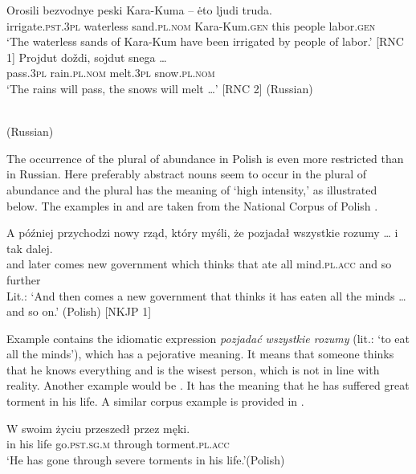 \documentclass[output=paper,colorlinks,citecolor=brown]{langscibook}
\begin{document}
\ea\label{ex:geist:42}
\ea\gll Orosili bezvodnye peski Kara-Kuma {--} ėto ljudi truda. \\
irrigate.\textsc{pst.3pl} waterless sand.\textsc{pl.nom} Kara-Kum.\textsc{gen} {} this people labor.\textsc{gen} \\
\glt `The waterless sands of Kara-Kum have been irrigated by people of labor.' \hfill [RNC 1]
\label{ex:geist:42a}
\ex\gll Projdut doždi, sojdut snega \ldots \\
pass.\textsc{3pl} rain.\textsc{pl.nom} melt.\textsc{3pl} snow.\textsc{pl.nom} \\
\glt `The rains will pass, the snows will melt \ldots' \hfill [RNC 2] 
\label{ex:geist:42b}
\z\hfill (Russian)\z

\\\hfill (Russian)
\label{ex:geist:43}
\z
	
\noindent The occurrence of the plural of abundance in Polish is even more restricted than in Russian. Here preferably abstract nouns seem to occur in the plural of abundance and the plural has the meaning of `high intensity,' as illustrated below. The examples in  and  are taken from the National Corpus of Polish \citep{PrzepiorkowskiLewandowska-Tomaszczyk2012}.

\ea\label{ex:geist:44}
\gll A później przychodzi nowy rząd, który myśli, że pozjadał wszystkie rozumy {\ldots} i tak dalej. \\
and later comes new government which thinks that ate all mind.\textsc{pl.acc} {} and so further \\ 
\glt Lit.: `And then comes a new government that thinks it has eaten all the minds \ldots and so on.' \hfill (Polish) [NKJP 1]  
\z

\noindent Example  contains the idiomatic expression \textit{pozjadać wszystkie rozumy} (lit.: `to eat all the minds'), which has a pejorative meaning. It means that someone thinks that he knows everything and is the wisest person, which is not in line with reality. Another example would be . It has the meaning that he has suffered great torment in his life. A similar corpus example is provided in .

\ea\label{ex:geist:45}
\gll W swoim życiu przeszedł przez męki.\\
in his life go.\textsc{pst.\textsc{sg.m}} through torment.\textsc{pl.acc} \\   
\glt `He has gone through severe torments in his life.'\hfill (Polish)
\z
\end{document}
